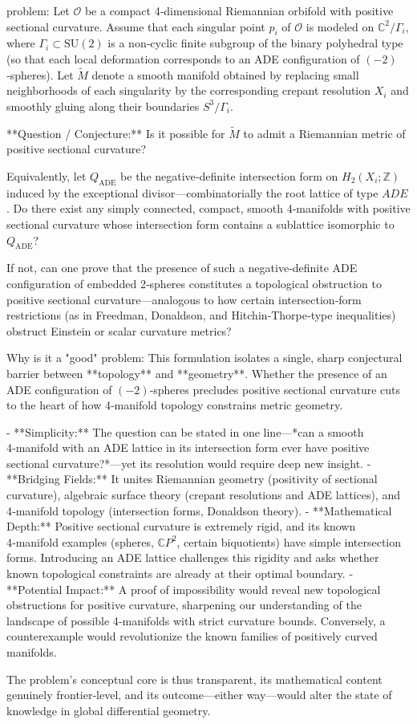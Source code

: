 problem:  
Let $\mathcal{O}$ be a compact 4‑dimensional Riemannian orbifold with positive sectional curvature. Assume that each singular point $p_i$ of $\mathcal{O}$ is modeled on $\mathbb{C}^2 / \Gamma_i$, where $\Gamma_i \subset \mathrm{SU}(2)$ is a non‑cyclic finite subgroup of the binary polyhedral type (so that each local deformation corresponds to an ADE configuration of $(-2)$‑spheres). Let $\widetilde{M}$ denote a smooth manifold obtained by replacing small neighborhoods of each singularity by the corresponding crepant resolution $X_i$ and smoothly gluing along their boundaries $S^3 / \Gamma_i$.  

**Question / Conjecture:**  
Is it possible for $\widetilde{M}$ to admit a Riemannian metric of positive sectional curvature?  

Equivalently, let $Q_{\mathrm{ADE}}$ be the negative‑definite intersection form on $H_2(X_i;\mathbb{Z})$ induced by the exceptional divisor—combinatorially the root lattice of type $A\!D\!E$.  
Do there exist any simply connected, compact, smooth 4‑manifolds with positive sectional curvature whose intersection form contains a sublattice isomorphic to $Q_{\mathrm{ADE}}$?  

If not, can one prove that the presence of such a negative‑definite ADE configuration of embedded 2‑spheres constitutes a topological obstruction to positive sectional curvature—analogous to how certain intersection‑form restrictions (as in Freedman, Donaldson, and Hitchin‑Thorpe‑type inequalities) obstruct Einstein or scalar curvature metrics?  

Why is it a "good" problem:  
This formulation isolates a single, sharp conjectural barrier between **topology** and **geometry**. Whether the presence of an ADE configuration of $(-2)$‑spheres precludes positive sectional curvature cuts to the heart of how 4‑manifold topology constrains metric geometry.  

- **Simplicity:**  The question can be stated in one line—*can a smooth 4‑manifold with an ADE lattice in its intersection form ever have positive sectional curvature?*—yet its resolution would require deep new insight.  
- **Bridging Fields:**  It unites Riemannian geometry (positivity of sectional curvature), algebraic surface theory (crepant resolutions and ADE lattices), and 4‑manifold topology (intersection forms, Donaldson theory).  
- **Mathematical Depth:**  Positive sectional curvature is extremely rigid, and its known 4‑manifold examples (spheres, $\mathbb{C}P^2$, certain biquotients) have simple intersection forms. Introducing an ADE lattice challenges this rigidity and asks whether known topological constraints are already at their optimal boundary.  
- **Potential Impact:**  A proof of impossibility would reveal new topological obstructions for positive curvature, sharpening our understanding of the landscape of possible 4‑manifolds with strict curvature bounds. Conversely, a counterexample would revolutionize the known families of positively curved manifolds.  

The problem’s conceptual core is thus transparent, its mathematical content genuinely frontier‑level, and its outcome—either way—would alter the state of knowledge in global differential geometry.